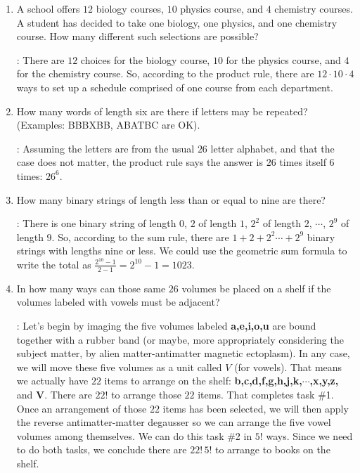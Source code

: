 \documentclass[11pt]{amsart}
\begin{document}
\begin{enumerate}
\item A school offers $12$ biology courses, $10$ physics course, and $4$ chemistry courses. A student has decided to take one biology,
one physics, and one chemistry course. How many different such selections
are possible?

:  There are $12$ choices for the biology course, $10$ for the physics
course, and $4$ for the chemistry course. So, according to the product rule, there are
$12\cdot10\cdot4$ ways to set up a schedule comprised of one course from each department.

\medskip

\item How many words of length
six are there if letters may be repeated? (Examples: BBBXBB, ABATBC are OK).

: Assuming the letters are from the usual $26$ letter alphabet, and that
the case does not matter, the product rule says the answer is $26$ times itself $6$ times:
$26^6$.

\medskip   

\item How many binary strings of length less than or equal to nine are there?

: There is one binary string of length $0$, $2$ of length $1$, $2^2$
of length $2$, $\cdots$, $2^9$ of length $9$. So, according to the sum rule, there are
$1+2+2^2 \cdots+2^9$ binary strings with lengths nine or less. We could use the geometric
sum formula to write the total as $\displaystyle \frac{2^{10} - 1}{2-1} = 2^{10}-1 = 1023$.

\medskip

\item In how many ways can those same $26$ volumes be placed on a shelf
 if the volumes labeled with vowels must be adjacent?
 
 : Let's begin by imaging the five volumes labeled {\bf a,e,i,o,u} are
 bound together with a rubber band (or maybe, more appropriately considering the subject
 matter, by alien matter-antimatter magnetic ectoplasm). In any case, we will move these
 five volumes as a unit called $V$ (for vowels). That means we actually have $22$ items to 
 arrange on the shelf: {\bf b,c,d,f,g,h,j,k,$\cdots$,x,y,z,} and {\bf V}. There are $22!$ to arrange those
 $22$ items. That completes task \#1. Once an arrangement of those $22$ items has been selected,
 we will then apply the reverse antimatter-matter degausser so we can arrange the five vowel
 volumes among themselves. We can do this task \#2 in $5!$ ways. Since we need to do both tasks, we conclude there
 are $22!\,5!$ to arrange to books on the shelf.
 

\end{enumerate}
\end{document}
